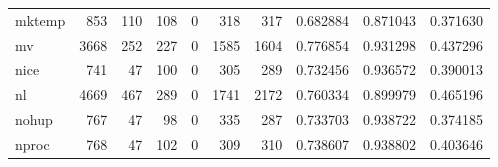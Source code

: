 \begin{tabular}{lrrrrrrrrr}
mktemp    &                                                853 &                                                110 &                                                108 &                                                  0 &                                                318 &                                                317 &                                           0.682884 &                               0.871043 &                             0.371630 \\
mv        &                                               3668 &                                                252 &                                                227 &                                                  0 &                                               1585 &                                               1604 &                                           0.776854 &                               0.931298 &                             0.437296 \\
nice      &                                                741 &                                                 47 &                                                100 &                                                  0 &                                                305 &                                                289 &                                           0.732456 &                               0.936572 &                             0.390013 \\
nl        &                                               4669 &                                                467 &                                                289 &                                                  0 &                                               1741 &                                               2172 &                                           0.760334 &                               0.899979 &                             0.465196 \\
nohup     &                                                767 &                                                 47 &                                                 98 &                                                  0 &                                                335 &                                                287 &                                           0.733703 &                               0.938722 &                             0.374185 \\
nproc     &                                                768 &                                                 47 &                                                102 &                                                  0 &                                                309 &                                                310 &                                           0.738607 &                               0.938802 &                             0.403646 \\

\end{tabular}
